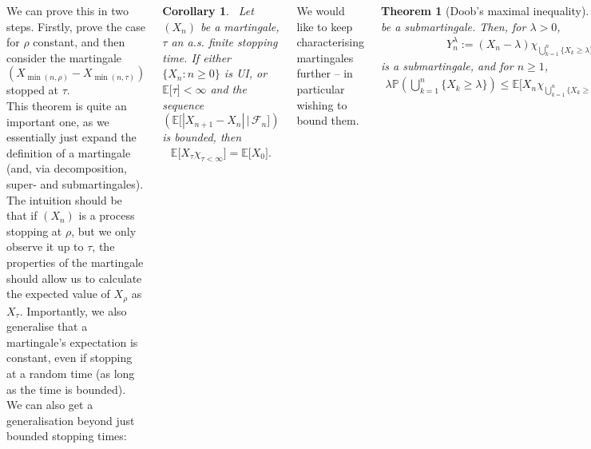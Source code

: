 \documentclass{tikzposter} %
\newtheorem{theorem}{Theorem}
\newtheorem{corollary}{Corollary}
\begin{document}
\begin{columns}
{    We can prove this in two steps. Firstly, prove the case for $\rho$ constant, and then consider the martingale $(X_{\min(n,\rho)}-X_{\min(n,\tau)})$ stopped at $\tau$. \\

    This theorem is quite an important one, as we essentially just expand the definition of a martingale (and, via decomposition, super- and submartingales). The intuition should be that if $(X_{n})$ is a process stopping at $\rho$, but we only observe it up to $\tau$, the properties of the martingale should allow us to calculate the expected value of $X_{\rho}$ as $X_{\tau}$. Importantly, we also generalise that a martingale's expectation is constant, even if stopping at a random time (as long as the time is bounded). \\

    We can also get a generalisation beyond just bounded stopping times:
    \begin{corollary}
      \ Let $(X_{n})$ be a martingale, $\tau$ an a.s. finite stopping time. If either $\{X_{n} : n \ge 0\}$ is UI, or $\mathbb{E}\big[\tau\big] < \infty$ and the sequence $\displaystyle        \left(\mathbb{E}\big[|X_{n+1}-X_{n}| \,\big|\, \mathcal{F}_{n}\big]\right)$ is bounded, then
      \begin{align*}
        \mathbb{E}\big[X_{\tau} \chi_{\tau < \infty}\big] = \mathbb{E}\big[X_{0}\big].
      \end{align*}
    \end{corollary}

    We would like to keep characterising martingales further -- in particular wishing to bound them.
    \begin{theorem}[Doob's maximal inequality]
      \ Let $(X_{n})$ be a submartingale. Then, for $\lambda > 0$,
      \begin{align*}
        Y^{\lambda}_{n} := (X_{n}-\lambda)\chi_{\bigcup_{k=1}^{n} \{X_{k} \ge \lambda\}}
      \end{align*}
      is a submartingale, and for $n \ge 1$,
      \begin{align*}
        \lambda \mathbb{P}\left(\bigcup_{k=1}^{n} \{X_{k} \ge \lambda\}\right) \le \mathbb{E}\big[X_{n} \chi_{\bigcup_{k=1}^{n} \{X_{k} \ge \lambda\}}\big] \le \mathbb{E}\big[|X_{n}|\big].
      \end{align*}
    \end{theorem}

}
\end{columns}
\end{document}
